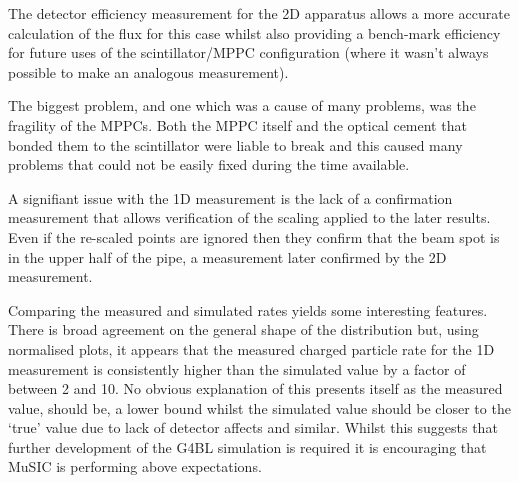 The detector efficiency measurement for the 2D apparatus allows a more accurate calculation of the flux for this case whilst also providing a bench-mark efficiency for future uses of the scintillator/MPPC configuration (where it wasn't always possible to make an analogous measurement). 

The biggest problem, and one which was a cause of many problems, was the fragility of the MPPCs. Both the MPPC itself and the optical cement that bonded them to the scintillator were liable to break and this caused many problems that could not be easily fixed during the time available. 

A signifiant issue with the 1D measurement is the lack of a confirmation measurement that allows verification of the scaling applied to the later results. Even if the re-scaled points are ignored then they confirm that the beam spot is in the upper half of the pipe, a measurement later confirmed by the 2D measurement. 

Comparing the measured and simulated rates yields some interesting features. There is broad agreement on the general shape of the distribution but, using normalised plots, it appears that the measured charged particle rate for the 1D measurement is consistently higher than the simulated value by a factor of between 2 and 10. No obvious explanation of this presents itself as the measured value, should be, a lower bound whilst the simulated value should be closer to the `true' value due to lack of detector affects and similar. Whilst this suggests that further development of the G4BL simulation is required it is encouraging that MuSIC is performing above expectations.

